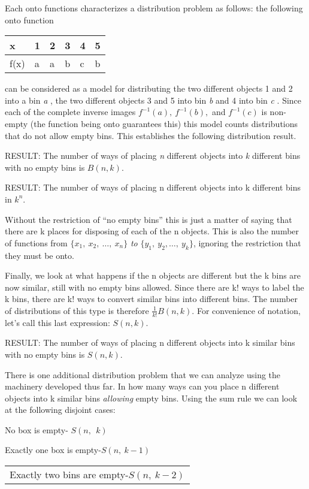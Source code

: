 \documentclass[10pt,letter]{article}
\renewenvironment{quote}
  {\begin{tabular}{|p{13cm}}}
  {\end{tabular}}
\begin{document}
Each onto functions characterizes a distribution problem as follows: the
following onto function
\begin{longtable}[]{@{}llllll@{}}
\toprule
x & 1 & 2 & 3 & 4 & 5\tabularnewline
\midrule
\endhead
f(x) & a & a & b & c & b\tabularnewline
\bottomrule

\end{longtable}

can be considered as a model for distributing the two different objects
1 and 2 into a bin \emph{a} , the two different objects 3 and 5 into bin
\emph{b} and 4 into bin \emph{c} . Since each of the complete inverse
images \(f^{- 1}\left( a \right),\ f^{- 1}\left( b \right),\) and
\(f^{- 1}(c)\) is non-empty (the function being onto guarantees this)
this model counts distributions that do not allow empty bins. This
establishes the following distribution result.

RESULT: The number of ways of placing \emph{n} different objects into
\emph{k} different bins with no empty bins is \(B(n,k)\).

RESULT: The number of ways of placing n different objects into k
different bins in \(k^{n}.\)

Without the restriction of ``no empty bins'' this is just a matter of
saying that there are k places for disposing of each of the n objects.
This is also the number of functions from
\(\{ x_{1},\ x_{2},\ \ldots,\ x_{n}\}\) \emph{to}
\(\{ y_{1},\ y_{2},\ldots,\ y_{k}\}\), ignoring the restriction that
they must be onto.

Finally, we look at what happens if the n objects are different but the
k bins are now similar, still with no empty bins allowed. Since there
are k! ways to label the k bins, there are k! ways to convert similar
bins into different bins. The number of distributions of this type is
therefore \(\frac{1}{k!}B(n,k)\). For convenience of notation, let's
call this last expression: \(S\left( n,k \right).\)

RESULT: The number of ways of placing n different objects into k similar
bins with no empty bins is \(S\left( n,k \right).\)

There is one additional distribution problem that we can analyze using
the machinery developed thus far. In how many ways can you place n
different objects into k similar bins \emph{allowing} empty bins. Using
the sum rule we can look at the following disjoint cases:

No box is empty- \(S(n,\ \ k)\)

Exactly one box is empty-\(S(n,\ k - 1)\)
\begin{quote}
Exactly two bins are empty-\(S(n,\ k - 2)\)

\end{quote}
\end{document}
